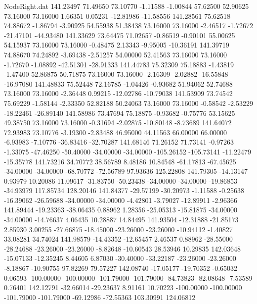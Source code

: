 \begin{filecontents}{NodeRight.dat}
 141.23497   71.49650   73.10770    -1.11588   -1.00844   57.62500   52.90625   73.16000   73.16000    1.66351    0.05231  -12.81986  -11.58556
 141.28561   75.62518   74.88672    -1.86794   -3.90925   54.55938   51.38438   73.16000   73.16000   -2.46517   -1.72672  -21.47101  -44.93480
 141.33629   73.64475   71.02657    -0.86519   -0.90101   55.00625   54.15937   73.16000   73.16000   -0.48475    2.13343   -9.95005  -10.36191
 141.39719   74.88670   74.24892    -3.69438   -2.51257   54.00000   52.41563   73.16000   73.16000   -1.72670   -1.08892  -42.51301  -28.91333
 141.44783   75.32309   75.18883    -1.43819   -1.47400   52.86875   50.71875   73.16000   73.16000   -2.16309   -2.02882  -16.55848  -16.97080
 141.48833   75.52448   72.16785    -1.04426   -0.93682   51.94062   52.74688   73.16000   73.16000   -2.36448    0.99215  -12.02786  -10.79038
 141.53909   73.74542   75.69229    -1.58144   -2.33350   52.82188   50.24063   73.16000   73.16000   -0.58542   -2.53229  -18.22461  -26.89140
 141.58986   73.47694   75.18875    -0.93682   -0.75776   53.15625   49.38750   73.16000   73.16000   -0.31694   -2.02875  -10.80148   -8.73689
 141.64072   72.93983   73.10776    -3.19300   -2.83488   46.95000   44.11563   66.00000   66.00000   -6.93983   -7.10776  -36.83416  -32.70287
 141.68146   71.26152   71.73141    -0.97263   -1.33075  -47.46250  -50.40000  -34.00000  -34.00000 -105.26152 -105.73141  -11.22479  -15.35778
 141.73216   34.70772   38.56789     8.48186   10.84548  -61.17813  -67.45625  -34.00000  -34.00000  -68.70772  -72.56789   97.93636  125.22808
 141.79305  -14.13147    0.93979    10.20086   11.09617  -31.83750  -50.23438  -34.00000  -34.00000  -19.86853  -34.93979  117.85734  128.20146
 141.84377  -29.57199  -30.20973    -1.11588   -0.25638  -16.39062  -26.59688  -34.00000  -34.00000   -4.42801   -3.79027  -12.89911   -2.96366
 141.89444  -19.23363  -38.06435     0.88962    1.28356  -25.05313  -15.81875  -34.00000  -34.00000  -14.76637    4.06435   10.28887   14.84495
 141.93504  -12.31888  -21.85173     2.85930    3.00255  -27.66875  -18.45000  -23.26000  -23.26000  -10.94112   -1.40827   33.08281   34.74024
 141.98579  -14.43352  -12.65457     2.46537    0.88962  -28.55000  -28.24688  -23.26000  -23.26000   -8.82648  -10.60543   28.53946   10.29835
 142.03648  -15.07133  -12.35245     8.44605    6.87030  -30.40000  -33.22187  -23.26000  -23.26000   -8.18867  -10.90755   97.82269   79.57227
 142.08740  -17.05177  -19.70352    -0.65032    0.06593 -100.00000 -100.00000 -101.79000 -101.79000  -84.73823  -82.08648   -7.53589    0.76401
 142.12791  -32.66014  -29.23637     8.91161   10.70223 -100.00000 -100.00000 -101.79000 -101.79000  -69.12986  -72.55363  103.30991  124.06812

\end{filecontents}
